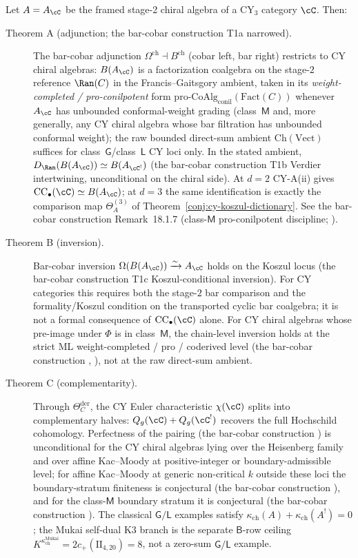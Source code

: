 \begin{theorem*}
Let $A = A_\cC$ be the framed stage-2 chiral algebra of a CY$_3$ category $\cC$. Then:
\begin{description}
 \item[Theorem A (adjunction; the bar-cobar construction T1a narrowed).] The bar-cobar adjunction $\Omega^{\mathrm{ch}} \dashv B^{\mathrm{ch}}$ (cobar left, bar right) restricts to CY chiral algebras: $B(A_\cC)$ is a factorization coalgebra on the stage-$2$ reference $\Ran(C)$ in the Francis--Gaitsgory ambient, taken in its \emph{weight-completed / pro-conilpotent} form $\mathrm{pro}\text{-}\mathrm{CoAlg}_{\mathrm{conil}}(\mathrm{Fact}(C))$ whenever $A_\cC$ has unbounded conformal-weight grading (class~$\mathsf{M}$ and, more generally, any CY chiral algebra whose bar filtration has unbounded conformal weight); the raw bounded direct-sum ambient $\mathrm{Ch}(\mathrm{Vect})$ suffices for class~$\mathsf{G}$/class~$\mathsf{L}$ CY loci only. In the stated ambient, $D_{\Ran}(B(A_\cC)) \simeq B(A_{\cC^!})$ (the bar-cobar construction T1b Verdier intertwining, unconditional on the chiral side). At $d=2$ CY-A(ii) gives $\mathrm{CC}_\bullet(\cC) \simeq B(A_\cC)$; at $d=3$ the same identification is exactly the comparison map $\Theta_A^{(3)}$ of Theorem~\ref{conj:cy-koszul-dictionary}. See the bar-cobar construction Remark~18.1.7 (class-$\mathsf{M}$ pro-conilpotent discipline; \cite{VolII}).

 \item[Theorem B (inversion).] Bar-cobar inversion $\Omega(B(A_\cC)) \xrightarrow{\sim} A_\cC$ holds on the Koszul locus (the bar-cobar construction T1c Koszul-conditional inversion). For CY categories this requires both the stage-$2$ bar comparison and the formality/Koszul condition on the transported cyclic bar coalgebra; it is not a formal consequence of $\mathrm{CC}_\bullet(\cC)$ alone. For CY chiral algebras whose pre-image under $\Phi$ is in class~$\mathsf{M}$, the chain-level inversion holds at the strict ML weight-completed / pro / coderived level (the bar-cobar construction \cite{VolI}, \cite{VolI}), not at the raw direct-sum ambient.

 \item[Theorem C (complementarity).] Through $\Theta_C^{\mathrm{der}}$, the CY Euler characteristic $\chi(\cC)$ splits into complementary halves: $Q_g(\cC) + Q_g(\cC^!)$ recovers the full Hochschild cohomology. Perfectness of the pairing (the bar-cobar construction \cite{VolI}) is unconditional for the CY chiral algebras lying over the Heisenberg family and over affine Kac--Moody at positive-integer or boundary-admissible level; for affine Kac--Moody at generic non-critical $k$ outside these loci the boundary-stratum finiteness is conjectural (the bar-cobar construction \cite{VolI}), and for the class-$\mathsf{M}$ boundary stratum it is conjectural (the bar-cobar construction \cite{VolI}). The classical $\mathsf{G}/\mathsf{L}$ examples satisfy $\kappa_{\mathrm{ch}}(A)+\kappa_{\mathrm{ch}}(A^!)=0$; the Mukai self-dual K3 branch is the separate $\mathsf{B}$-row ceiling $K^{\kappa_{\mathrm{ch}}^{\mathrm{Mukai}}}=2c_+(\mathrm{II}_{4,20})=8$, not a zero-sum $\mathsf{G}/\mathsf{L}$ example.


\end{description}
\end{theorem*}
